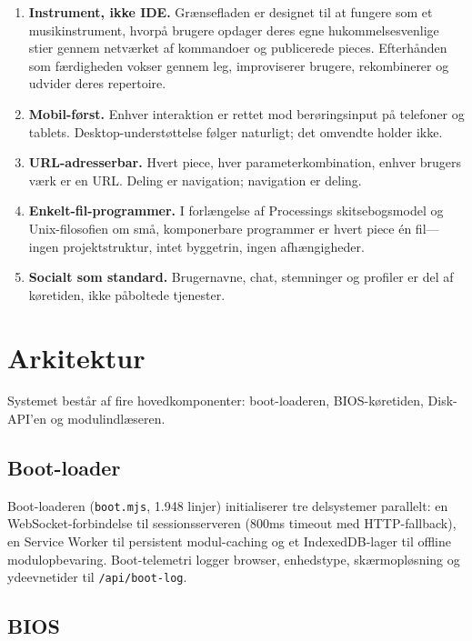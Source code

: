 \documentclass[10pt,letterpaper,twocolumn]{article}
\begin{document}
\begin{enumerate}
  \item \textbf{Instrument, ikke IDE.} Grænsefladen er designet til at fungere som et musikinstrument, hvorpå brugere opdager deres egne hukommelsesvenlige stier gennem netværket af kommandoer og publicerede pieces. Efterhånden som færdigheden vokser gennem leg, improviserer brugere, rekombinerer og udvider deres repertoire.
  \item \textbf{Mobil-først.} Enhver interaktion er rettet mod berøringsinput på telefoner og tablets. Desktop-understøttelse følger naturligt; det omvendte holder ikke.
  \item \textbf{URL-adresserbar.} Hvert piece, hver parameterkombination, enhver brugers værk er en URL. Deling er navigation; navigation er deling.
  \item \textbf{Enkelt-fil-programmer.} I forlængelse af Processings skitsebogsmodel og Unix-filosofien om små, komponerbare programmer er hvert piece én fil---ingen projektstruktur, intet byggetrin, ingen afhængigheder.
  \item \textbf{Socialt som standard.} Brugernavne, chat, stemninger og profiler er del af køretiden, ikke påboltede tjenester.
\end{enumerate}


\section{Arkitektur}
\label{sec:architecture}

Systemet består af fire hovedkomponenter: boot-loaderen, BIOS-køretiden, Disk-API'en og modulindlæseren.

\subsection{Boot-loader}

Boot-loaderen (\texttt{boot.mjs}, 1.948 linjer) initialiserer tre delsystemer parallelt: en WebSocket-forbindelse til sessionsserveren (800ms timeout med HTTP-fallback), en Service Worker til persistent modul-caching og et IndexedDB-lager til offline modulopbevaring. Boot-telemetri logger browser, enhedstype, skærmopløsning og ydeevnetider til \texttt{/api/boot-log}.

\subsection{BIOS}
\end{document}
